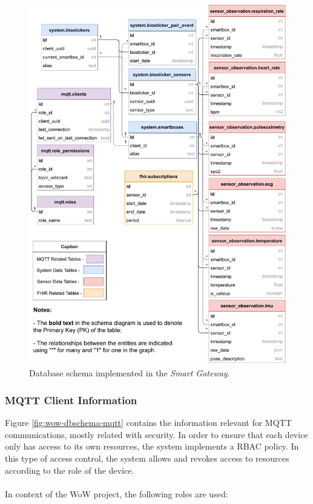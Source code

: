 \begin{figure}[H]
    \centering
    \includegraphics[width=0.86\linewidth]{images/database-schema-general.pdf}
    \caption[Database schema implemented in the \textit{Smart Gateway}.]{Database schema implemented in the \textit{Smart Gateway}.}
    \label{fig:wow-dbschema-full}
\end{figure}

\subsubsection{MQTT Client Information}

Figure \ref{fig:wow-dbschema-mqtt} contains the information relevant for \acs{MQTT} communications, mostly related with security. In order to ensure that each device only has access to its own resources, the system implements a \acf{RBAC} policy. 
In this type of access control, the system allows and revokes access to resources according to the role of the device.

\paragraph{} In context of the \acs{WoW} project, the following roles are used:


